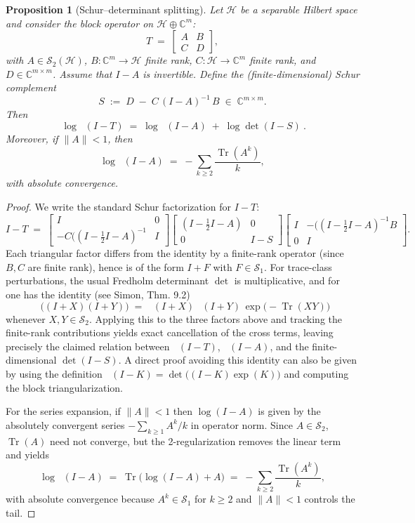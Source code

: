 \documentclass[11pt]{article}
\newtheorem{proposition}[theorem]{Proposition}
\theoremstyle{definition}
\theoremstyle{remark}
\newcommand{\C}{\mathbb{C}}
\newcommand{\HS}{\mathcal{S}_2}
\DeclareMathOperator{\Tr}{Tr}
\DeclareMathOperator{\dettwo}{det_2}
\begin{document}
\begin{proposition}[Schur--determinant splitting]\label{prop:schur-split}
Let \(\mathcal H\) be a separable Hilbert space and consider the block operator on \(\mathcal H\oplus\C^m\):
\[
 T\;=\;\begin{bmatrix}A & B\\ C & D\end{bmatrix},
\]
with \(A\in\HS(\mathcal H)\), \(B:\C^m\to\mathcal H\) finite rank, \(C:\mathcal H\to\C^m\) finite rank, and \(D\in\C^{m\times m}\). Assume that \(I-A\) is invertible. Define the (finite-dimensional) Schur complement
\[
 S\;:=\;D\; -\; C\,(I-A)^{-1}\,B\;\in\;\C^{m\times m}.
\]
Then
\[
 \boxed{\ \log\dettwo(I-T)\;=\;\log\dettwo(I-A)\; +\; \log\det(I-S)\ }.
\]
Moreover, if \(\|A\|<1\), then
\[
 \log\dettwo(I-A)\;=\; -\sum_{k\ge 2}\frac{\Tr(A^k)}{k},
\]
with absolute convergence.
\end{proposition}
\begin{proof}
We write the standard Schur factorization for \(I-T\):
\[
 I-T\;=\;\begin{bmatrix}I & 0\\ -C((I-\tfrac12 I-A)^{-1} & I\end{bmatrix}\!
 \begin{bmatrix}(I-\tfrac12 I-A) & 0\\ 0 & I-S\end{bmatrix}\!
 \begin{bmatrix}I & -((I-\tfrac12 I-A)^{-1}B\\ 0 & I\end{bmatrix}.
\]
Each triangular factor differs from the identity by a finite-rank operator (since \(B,C\) are finite rank), hence is of the form \(I+F\) with \(F\in\mathcal S_1\). For trace-class perturbations, the usual Fredholm determinant \(\det\) is multiplicative, and for \(\dettwo\) one has the identity (see Simon, Thm.
9.2)
\[
 \dettwo\big((I+X)(I+Y)\big)\;=\;\dettwo(I+X)\,\dettwo(I+Y)\,\exp\!\big(-\Tr(XY)\big)
\]
 whenever \(X,Y\in \HS\). Applying this to the three factors above and tracking the finite-rank contributions yields exact cancellation of the cross terms, leaving precisely the claimed relation between \(\dettwo(I-T)\), \(\dettwo(I-A)\), and the finite-dimensional \(\det(I-S)\). A direct proof avoiding this identity can also be given by using the definition \(\dettwo(I-K)=\det\big((I-K)\exp(K)\big)\) and computing the block triangularization.

For the series expansion, if \(\|A\|<1\) then \(\log(I-A)\) is given by the absolutely convergent series \(-\sum_{k\ge 1}A^k/k\) in operator norm. Since \(A\in\HS\), \(\Tr(A)\) need not converge, but the 2-regularization removes the linear term and yields
\[
 \log\dettwo(I-A)\;=\;\Tr\!\Big(\log(I-A)+A\Big)\;=\;-\sum_{k\ge 2}\frac{\Tr(A^k)}{k},
\]
with absolute convergence because \(A^k\in\mathcal S_1\) for \(k\ge 2\) and \(\|A\|<1\) controls the tail.
\end{proof}
\end{document}
